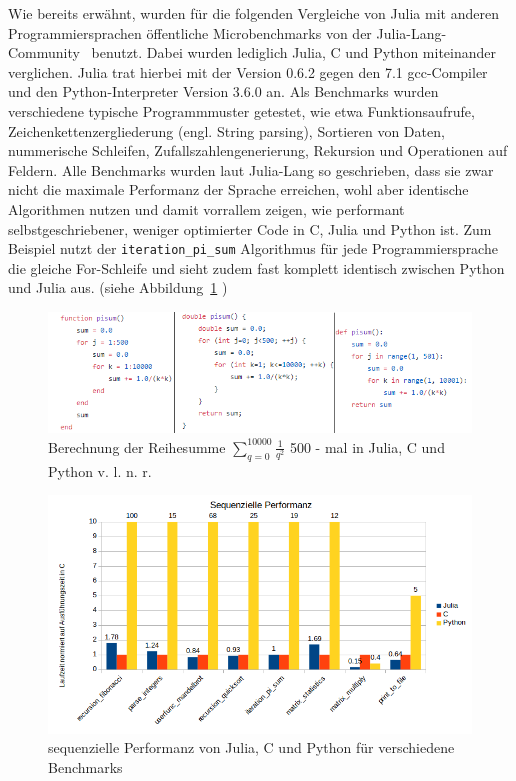\documentclass[proseminar,german,utf8]{zihpub}
\begin{document}
Wie bereits erwähnt, wurden für die folgenden Vergleiche von Julia mit anderen Programmiersprachen öffentliche Microbenchmarks von der Julia-Lang-Community~\cite{JuliaMicroBenchmarks} benutzt. Dabei wurden lediglich Julia, C und Python miteinander verglichen. Julia trat hierbei mit der Version 0.6.2 gegen den 7.1 gcc-Compiler und den Python-Interpreter Version 3.6.0 an. Als Benchmarks wurden verschiedene typische Programmmuster getestet, wie etwa Funktionsaufrufe, Zeichenkettenzergliederung (engl. String parsing), Sortieren von Daten, nummerische Schleifen, Zufallszahlengenerierung, Rekursion und Operationen auf Feldern. Alle Benchmarks wurden laut Julia-Lang so geschrieben, dass sie zwar nicht die maximale Performanz der Sprache erreichen, wohl aber identische Algorithmen nutzen und damit vorrallem zeigen, wie performant selbstgeschriebener, weniger optimierter Code in C, Julia und Python ist. Zum Beispiel nutzt der \verb|iteration_pi_sum| Algorithmus für jede Programmiersprache die gleiche For-Schleife und sieht zudem fast komplett identisch zwischen Python und Julia aus. (siehe Abbildung~\ref{fig:pisum} )

\begin{figure}[hbt!]
  \centering
  \includegraphics[scale=2.5]{bilder/pisum.png}
  \caption{Berechnung der Reihesumme $\sum_{q=0}^{10000} \frac{1}{q^{2}}$ 500 - mal in Julia, C und Python v. l. n. r. }
  \label{fig:pisum}
\end{figure}

\begin{figure}[hbt!]
  \centering
  \includegraphics[scale=0.8]{bilder/sequenziell_performance.png}
  \caption{sequenzielle Performanz von Julia, C und Python für verschiedene Benchmarks}
  \label{fig:sequPerform}
\end{figure}
\end{document}
